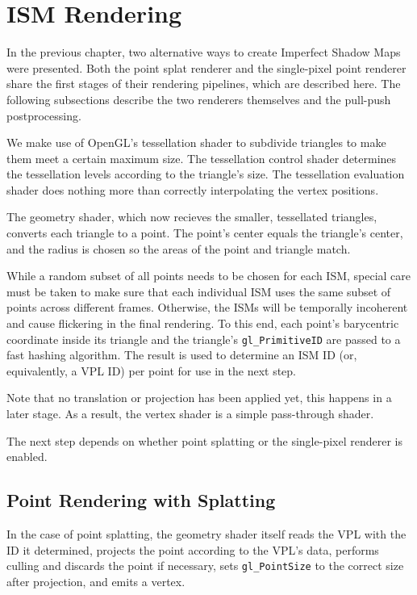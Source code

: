\section{ISM Rendering}
\label{sec:impl:ismRendering}

In the previous chapter, two alternative ways to create Imperfect Shadow Maps were presented. Both the point splat renderer and the single-pixel point renderer share the first stages of their rendering pipelines, which are described here. The following subsections describe the two renderers themselves and the pull-push postprocessing.

We make use of OpenGL's tessellation shader to subdivide triangles to make them meet a certain maximum size. The tessellation control shader determines the tessellation levels according to the triangle's size. The tessellation evaluation shader does nothing more than correctly interpolating the vertex positions.

The geometry shader, which now recieves the smaller, tessellated triangles, converts each triangle to a point. The point's center equals the triangle's center, and the radius is chosen so the areas of the point and triangle match.


While a random subset of all points needs to be chosen for each ISM, special care must be taken to make sure that each individual ISM uses the same subset of points across different frames. Otherwise, the ISMs will be temporally incoherent and cause flickering in the final rendering. To this end, each point's barycentric coordinate inside its triangle and the triangle's \texttt{gl\_PrimitiveID} are passed to a fast hashing algorithm. The result is used to determine an ISM ID (or, equivalently, a VPL ID) per point for use in the next step.

Note that no translation or projection has been applied yet, this happens in a later stage. As a result, the vertex shader is a simple pass-through shader.

The next step depends on whether point splatting or the single-pixel renderer is enabled.



\subsection{Point Rendering with Splatting}
\label{sec:impl:splatting}

In the case of point splatting, the geometry shader itself reads the VPL with the ID it determined, projects the point according to the VPL's data, performs culling and discards the point if necessary, sets \texttt{gl\_PointSize} to the correct size after projection, and emits a vertex.

